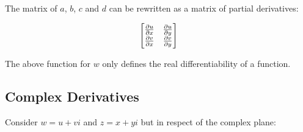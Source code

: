 \documentclass[12pt]{article}
\begin{document}
	The matrix of $a$, $b$, $c$ and $d$ can be rewritten as a matrix of partial derivatives:
	
	\begin{equation*}
		\begin{bmatrix}
			\frac{\partial u}{\partial x} & \frac{\partial u}{\partial y} \\
			\frac{\partial v}{\partial x} & \frac{\partial v}{\partial y}
		\end{bmatrix}
	\end{equation*}
	
	The above function for $w$ only defines the real differentiability of a function.
	
	\subsection{Complex Derivatives}
	
	Consider $w = u + vi$ and $z = x + yi$ but in respect of the complex plane:
	
	
\end{document}
